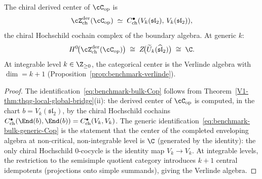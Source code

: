\begin{proposition}
\label{prop:benchmark-bulk-from-Cop}
The chiral derived center of\/ $\cC_{\mathrm{op}}$ is
\begin{equation}\label{eq:benchmark-bulk-Cop}
 \cZ^{\mathrm{der}}_{\mathrm{ch}}(\cC_{\mathrm{op}})
 \;\simeq\;
 C^\bullet_{\mathrm{ch}}(V_k(\mathfrak{sl}_2),\,
 V_k(\mathfrak{sl}_2)),
\end{equation}
the chiral Hochschild cochain complex of the boundary algebra.
At generic $k$:
\begin{equation}\label{eq:benchmark-bulk-generic-Cop}
 H^0\!\bigl(
 \cZ^{\mathrm{der}}_{\mathrm{ch}}(\cC_{\mathrm{op}})
 \bigr)
 \;\cong\;
 Z\!\bigl(\widetilde{U}_k(\widehat{\mathfrak{sl}}_2)\bigr)
 \;\cong\; \C.
\end{equation}
At integrable level $k \in \Z_{\ge 0}$, the categorical
center is the Verlinde algebra with
$\dim = k + 1$ \textup{(}Proposition~\textup{\ref{prop:benchmark-verlinde}}\textup{)}.
\end{proposition}

\begin{proof}
The identification~\eqref{eq:benchmark-bulk-Cop} follows from
Theorem~\ref*{V1-thm:thqg-local-global-bridge}(ii): the derived
center of $\cC_{\mathrm{op}}$ is computed, in the chart
$b = V_k(\mathfrak{sl}_2)$, by the chiral Hochschild cochains
$C^\bullet_{\mathrm{ch}}(\End(b), \End(b))
= C^\bullet_{\mathrm{ch}}(V_k, V_k)$.
The generic identification~\eqref{eq:benchmark-bulk-generic-Cop}
is the statement that the center of the completed enveloping
algebra at non-critical, non-integrable level is
$\C$ (generated by the identity): the only chiral Hochschild
$0$-cocycle is the identity map $V_k \to V_k$.
At integrable levels, the restriction to the semisimple quotient
category introduces $k+1$ central idempotents (projections onto
simple summands), giving the Verlinde algebra.
\end{proof}


